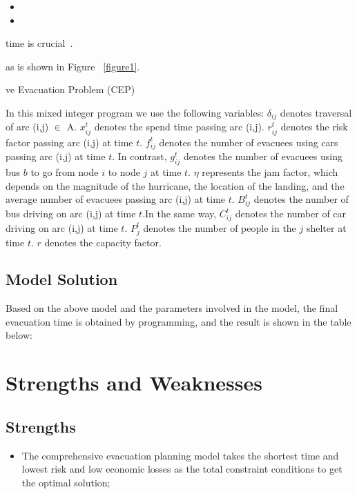 \documentclass{mcmthesis}
\begin{document}
\begin{itemize}

\item 
\item 
\end{itemize}

time is crucial~\cite{Sayyady2010Optimizing,So2010Managing}.



as is shown in Figure ~\ref{figure1}.

ve Evacuation Problem (CEP)\cite{Murray2013Evacuation,Ng2015Sharp,Ng2010Reliable}

In this mixed integer program we use the following variables: $\delta _{ij}$ denotes traversal of arc (i,j) $ \in $ A. $x_{ij}^t$ denotes the spend time passing arc (i,j). $r_{ij}^t$ denotes the risk factor passing arc (i,j) at time $t$. $f_{ij}^t$ denotes the number of evacuees using cars passing arc (i,j) at time $t$. In contrast, $g_{ij}^t$ denotes the number of evacuees using bus $b$ to go from node $i$ to node $j$ at time $t$. $\eta $ represents the jam factor, which depends on the magnitude of the hurricane, the location of the landing, and the average number of evacuees passing arc (i,j) at time $t$. $B_{ij}^t$ denotes the number of bus driving on arc (i,j) at time $t$.In the same way, $C_{ij}^t$ denotes the number of car driving on arc (i,j) at time $t$. $P_j^t$  denotes the number of people in the $j$ shelter at time $t$. $r$ denotes the capacity factor.


\subsection{Model Solution}
Based on the above model and the parameters involved in the model, the final evacuation time is obtained by programming, and the result is shown in the table below:


\section{Strengths and Weaknesses}

\subsection{Strengths}

\begin{itemize}
  \item The comprehensive evacuation planning model takes the shortest time and lowest risk and low economic losses as the total constraint conditions to get the optimal solution;
\end{itemize}
\end{document}

